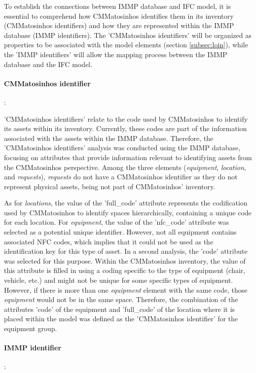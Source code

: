 \documentclass[a4paper, 10pt, twocolumn, twoside]{article}
\begin{document}
To establish the connections between IMMP database and IFC model, it is essential to comprehend how CMMatosinhos identifies them in its inventory (CMMatosinhos identifiers) and how they are represented within the IMMP database (IMMP identifiers). The 'CMMatosinhos identifiers' will be organized as properties to be associated with the model elements (section \ref{subsec:loin}), while the 'IMMP identifiers' will allow the mapping process between the IMMP database and the IFC model.

\paragraph{CMMatosinhos identifier}:

'CMMatosinhos identifiers' relate to the code used by CMMatosinhos to identify its assets within its inventory. Currently, these codes are part of the information associated with the assets within the IMMP database. Therefore, the 'CMMatosinhos identifiers' analysis was conducted using the IMMP database, focusing on attributes that provide information relevant to identifying assets from the CMMatosinhos perspective. Among the three elements (\emph{equipment}, \emph{location}, and \emph{requests}), \emph{requests} do not have a CMMatosinhos identifier as they do not represent physical assets, being not part of CMMatosinhos' inventory. 

As for \emph{locations}, the value of the 'full\_code' attribute represents the codification used by CMMatosinhos to identify spaces hierarchically, containing a unique code for each location. For \emph{equipment}, the value of the 'nfc\_code' attribute was selected as a potential unique identifier. However, not all equipment contains associated NFC codes, which implies that it could not be used as the identification key for this type of asset. In a second analysis, the 'code' attribute was selected for this purpose. Within the CMMatosinhos inventory, the value of this attribute is filled in using a coding specific to the type of equipment (chair, vehicle, etc.) and might not be unique for some specific types of equipment. However, if there is more than one \emph{equipment} element with the same code, those \emph{equipment} would not be in the same space. Therefore, the combination of the attributes 'code' of the equipment and 'full\_code' of the location where it is placed within the model was defined as the 'CMMatosinhos identifier' for the equipment group.

\paragraph{IMMP identifier}:
\end{document}
